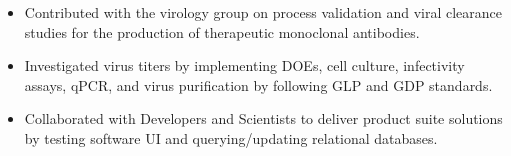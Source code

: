 \documentclass[10pt,a4paper]{altacv}
\begin{document}
\medskip







\begin{itemize}
    \item   \small{Contributed with the virology group on process validation and viral clearance studies for the production of therapeutic monoclonal antibodies.}
    \item   \small{Investigated virus titers by implementing DOEs, cell culture, infectivity assays, qPCR, and virus purification by following GLP and GDP standards.}
\end{itemize}

\medskip



\begin{itemize}
    \item   \small{Collaborated with Developers and Scientists to deliver product suite solutions by testing software UI and querying/updating relational databases.}
\end{itemize}

\medskip

\end{document}
